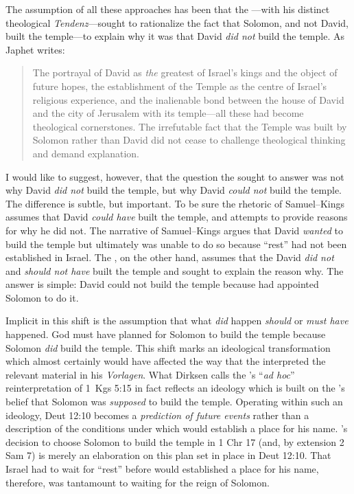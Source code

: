 The assumption of all these approaches has been that the \chronicler---with his distinct theological \emph{Tendenz}---sought to rationalize the fact that Solomon, and not David, built the temple---to explain why it was that David \emph{did not} build the temple. As Japhet writes:
\begin{quote}
    The portrayal of David as \emph{the} greatest of Israel's kings and the object of future hopes, the establishment of the Temple as the centre of Israel's religious experience, and the inalienable bond between the house of David and the city of Jerusalem with its temple---all these had become theological cornerstones. The irrefutable fact that the Temple was built by Solomon rather than David did not cease to challenge theological thinking and demand explanation.\autocite[396]{japhet1993}
\end{quote}
\noindent
I would like to suggest, however, that the question the \chronicler sought to answer was not why David \emph{did not} build the temple, but why David \emph{could not} build the temple. The difference is subtle, but important. To be sure the rhetoric of Samuel--Kings assumes that David \emph{could have} built the temple, and attempts to provide reasons for why he did not. The narrative of Samuel--Kings argues that David \emph{wanted} to build the temple but ultimately  was unable to do so because ``rest'' had not been established in Israel. The \chronicler, on the other hand, assumes that the David \emph{did not} and \emph{should not have} built the temple and sought to explain the reason why. The answer is simple: David could not build the temple because \yahweh had appointed Solomon to do it. 

Implicit in this shift is the assumption that what \emph{did} happen
\emph{should} or \emph{must have} happened. God must have planned for Solomon to build the temple because Solomon \emph{did} build the temple. This shift marks an ideological transformation which almost certainly would have affected the way that the \chronicler interpreted the relevant material in his \emph{Vorlagen}. What Dirksen calls the \chronicler's ``\emph{ad hoc}'' reinterpretation of 1~Kgs 5:15 in fact reflects an ideology which is built on the \chronicler's belief that Solomon was \emph{supposed} to build the temple. Operating within such an ideology, Deut 12:10 becomes a \emph{prediction of future events} rather than a description of the conditions under which \yahweh would establish a place for his name. \yahweh's decision to choose Solomon to build the temple in 1 Chr 17 (and, by extension 2 Sam 7) is merely an elaboration on this plan set in place in Deut 12:10. That Israel had to wait for ``rest'' before \yahweh would established a place for his name, therefore, was tantamount to waiting for the reign of Solomon. 

